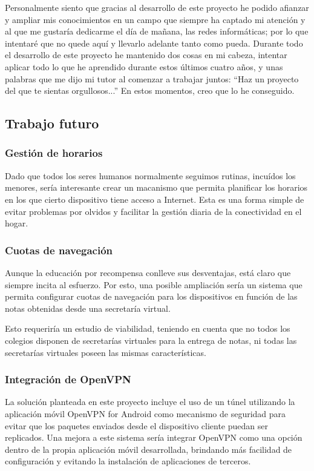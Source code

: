 \documentclass[12pt]{article}
\begin{document}

    Personalmente siento que gracias al desarrollo de este proyecto he podido afianzar y ampliar mis conocimientos en un campo que siempre ha captado mi atención y al que me gustaría dedicarme el día de mañana, las redes informáticas; por lo que intentaré que no quede aquí y llevarlo adelante tanto como pueda. Durante todo el desarrollo de este proyecto he mantenido dos cosas en mi cabeza, intentar aplicar todo lo que he aprendido durante estos últimos cuatro años, y unas palabras que me dijo mi tutor al comenzar a trabajar juntos: ``Haz un proyecto del que te sientas orgullosos...'' En estos momentos, creo que lo he conseguido.

    \subsection{Trabajo futuro}
        \subsubsection{Gestión de horarios}
        Dado que todos los seres humanos normalmente seguimos rutinas, incuídos los menores, sería interesante crear un macanismo que permita planificar los horarios en los que cierto dispositivo tiene acceso a Internet. Esta es una forma simple de evitar problemas por olvidos y facilitar la gestión diaria de la conectividad en el hogar.

        \subsubsection{Cuotas de navegación}
        Aunque la educación por recompensa conlleve sus desventajas, está claro que siempre incita al esfuerzo. Por esto, una posible ampliación sería un sistema que permita configurar cuotas de navegación para los dispositivos en función de las notas obtenidas desde una secretaría virtual.

        Esto requeriría un estudio de viabilidad, teniendo en cuenta que no todos los colegios disponen de secretarías virtuales para la entrega de notas, ni todas las secretarías virtuales poseen las mismas características.

        \subsubsection{Integración de OpenVPN}
        La solución planteada en este proyecto incluye el uso de un túnel utilizando la aplicación móvil OpenVPN for Android como mecanismo de seguridad para evitar que los paquetes enviados desde el dispositivo cliente puedan ser replicados. Una mejora a este sistema sería integrar OpenVPN como una opción dentro de la propia aplicación móvil desarrollada, brindando más facilidad de configuración y evitando la instalación de aplicaciones de terceros.
\end{document}
